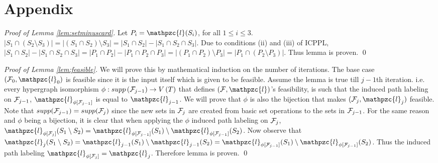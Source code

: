 \documentclass[11pt,letter]{../lib/llncs}
\def\cF{{\cal F}}
\def\cl{\mathpzc{l}}
\begin{document}
\pagebreak
\appendix

\section{Appendix}
\begin{proof}[Proof of Lemma \ref{lem:setminuscard}]
  Let $P_i = \cl(S_i)$, for all $1 \le i \le  3$.
  $|S_1 \cap (S_2 \setminus S_3)| = |(S_1 \cap S_2) \setminus S_3| =
  |S_1 \cap S_2| - |S_1 \cap S_2 \cap S_3|$. Due to conditions (ii)
  and (iii) of ICPPL, $|S_1 \cap S_2| - |S_1 \cap S_2 \cap S_3| = |P_1
  \cap P_2| - |P_1 \cap P_2 \cap P_3| = |(P_1 \cap P_2) \setminus P_3|
  = |P_1 \cap (P_2 \setminus P_3)|$. Thus lemma is proven. \qed
\end{proof}


\noindent
\begin{proof}[Proof of Lemma \ref{lem:feasible}]
  We will prove this by mathematical induction on the number of
  iterations. The base case $(\cF_0, \cl_0)$ is feasible since it is
  the input itself which is given to be feasible. Assume the lemma is
  true till $j-1$th iteration. i.e. every hypergraph isomorphism
  $\phi: supp\left(\cF_{j-1}\right) \rightarrow V\left(T \right)$ that
  defines $(\cF, \cl)$'s feasibility, is such
  that the induced path labeling on $\cF_{j-1}$,
  $\cl_{\phi[{\cF_{j-1}}]}$ is equal to $\cl_{j-1}$. We will prove
  that $\phi$ is also the bijection that makes $(\cF_j, \cl_j)$
  feasible. Note that $supp(\cF_{j-1}) = supp(\cF_{j})$ since the new
  sets in $\cF_j$ are created from basic set operations to the sets in
  $\cF_{j-1}$. For the same reason and $\phi$ being a bijection, it is
  clear that when applying the $\phi$ induced path labeling on
  $\cF_j$, $ \cl_{\phi[{\cF_{j}}]}(S_1 \setminus S_2) =
  \cl_{\phi[{\cF_{j-1}}]}(S_1) \setminus
  \cl_{\phi[{\cF_{j-1}}]}(S_2)$. Now observe that $ \cl_j(S_1
  \setminus S_2) = \cl_{j-1}(S_1) \setminus \cl_{j-1}(S_2) =
  \cl_{\phi[{\cF_{j-1}}]}(S_1) \setminus
  \cl_{\phi[{\cF_{j-1}}]}(S_2)$. Thus the induced path labeling
  $\cl_{\phi[{\cF_{j}}]} = \cl_{j}$. Therefore lemma is proven.  \qed
\end{proof}
\end{document}

